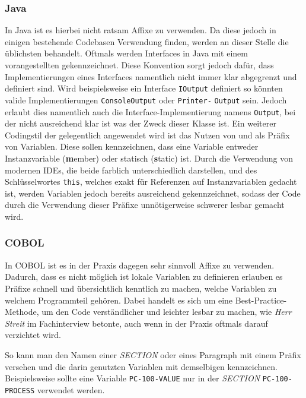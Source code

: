 \subsubsection*{Java}
In Java ist es hierbei nicht ratsam Affixe zu verwenden. Da diese jedoch in einigen bestehende Codebasen Verwendung finden, werden an dieser Stelle die üblichsten behandelt.
Oftmals werden Interfaces in Java mit einem vorangestellten  gekennzeichnet. Diese Konvention sorgt jedoch dafür, dass Implementierungen eines Interfaces namentlich nicht immer klar abgegrenzt und definiert sind. Wird beispielsweise ein Interface \texttt{IOutput} definiert so könnten valide Implementierungen \texttt{ConsoleOutput} oder \texttt{Printer-} \texttt{Output} sein. Jedoch erlaubt dies namentlich auch die Interface-Implementierung namens \texttt{Output}, bei der nicht ausreichend klar ist was der Zweck dieser Klasse ist.
Ein weiterer Codingstil der gelegentlich angewendet wird ist das Nutzen von  und  als Präfix von Variablen. Diese sollen kennzeichnen, dass eine Variable entweder Instanzvariable (\textbf{m}ember) oder statisch (\textbf{s}tatic) ist. Durch die Verwendung von modernen IDEs, die beide farblich unterschiedlich darstellen, und des Schlüsselwortes \texttt{this}, welches exakt für Referenzen auf Instanzvariablen gedacht ist, werden Variablen jedoch bereits ausreichend gekennzeichnet, sodass der Code durch die Verwendung dieser Präfixe unnötigerweise schwerer lesbar gemacht wird.

\subsubsection*{COBOL}\label{affixCOBOL}
In COBOL ist es in der Praxis dagegen sehr sinnvoll Affixe zu verwenden. Dadurch, dass es nicht möglich ist lokale Variablen zu definieren erlauben es Präfixe schnell und übersichtlich kenntlich zu machen, welche Variablen zu welchem Programmteil gehören. Dabei handelt es sich um eine Best-Practice-Methode, um den Code verständlicher und leichter lesbar zu machen, wie \textit{Herr Streit} im Fachinterview betonte, auch wenn in der Praxis oftmals darauf verzichtet wird.

So kann man den Namen einer \textit{SECTION} oder eines Paragraph mit einem Präfix versehen und die darin genutzten Variablen mit demselbigen kennzeichnen. Beispielsweise sollte eine Variable \texttt{PC-100-VALUE} nur in der \textit{SECTION} \texttt{PC-100-PROCESS} verwendet werden. 

